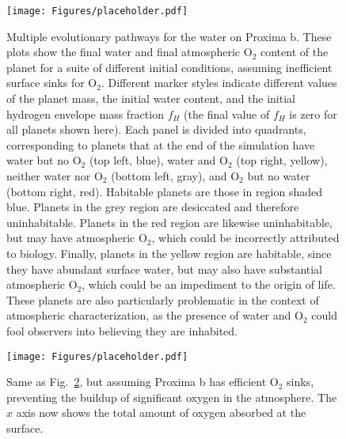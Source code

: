\documentclass[preprint,12pt]{aastex}
\begin{document}
\begin{figure}[ht]
\centering
\texttt{[image: Figures/placeholder.pdf]}
\caption{Multiple evolutionary pathways for the water on Proxima
 b. These plots show the final water and final atmospheric O$_2$ content of the
 planet for a suite of different initial conditions, assuming inefficient
 surface sinks for O$_2$. Different marker
 styles indicate different values of the planet mass, the initial
 water content, and the initial hydrogen envelope mass fraction $f_H$
 (the final value of $f_H$ is zero for all planets shown here). 
 Each panel is divided into
 quadrants, corresponding to planets that at the end of the
 simulation have water but no O$_2$ (top left, blue), water and O$_2$ (top
 right, yellow), neither water nor O$_2$ (bottom left, gray), and O$_2$ but no
 water (bottom right, red). Habitable planets are those in region shaded
 blue. Planets in the grey region are desiccated and therefore
 uninhabitable. Planets in the red region are likewise
 uninhabitable, but may have atmospheric O$_2$,
 which could be incorrectly attributed to biology. Finally, planets
 in the yellow region are habitable, since they have abundant surface
 water, but may also have substantial atmospheric O$_2$, which could
 be an impediment to the origin of life. These planets are also
 particularly problematic in the context of atmospheric
 characterization, as the presence of water and O$_2$ could fool
 observers into believing they are inhabited.}
\label{fig:atmesc:synthA}
\end{figure}

\begin{figure}[ht]
\centering
\texttt{[image: Figures/placeholder.pdf]}
\caption{Same as Fig.~\ref{fig:atmesc:synthB}, but assuming Proxima b
 has efficient O$_2$ sinks, preventing the buildup of significant oxygen in the
 atmosphere. The $x$ axis now shows the total amount of oxygen absorbed at the surface.}
\label{fig:atmesc:synthB}
\end{figure}
\end{document}
